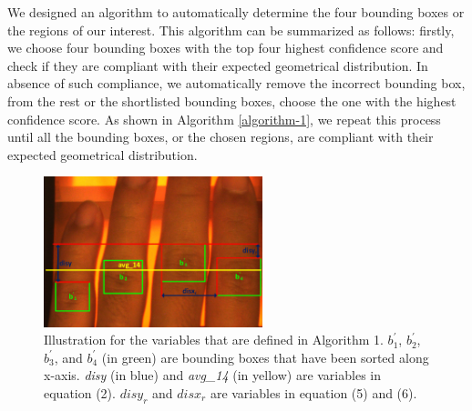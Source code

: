 We designed an algorithm to automatically determine the four bounding boxes or the regions of our interest. This algorithm can be summarized as follows: firstly, we choose four bounding boxes with the top four highest confidence score and check if they are compliant with their expected geometrical distribution. In absence of such compliance, we automatically remove the incorrect bounding box, from the rest or the shortlisted bounding boxes, choose the one with the highest confidence score. As shown in Algorithm \ref{algorithm-1}, we repeat this process until all the bounding boxes, or the chosen regions, are compliant with their expected geometrical distribution.

\begin{figure}[!ht]
    \centering
    \includegraphics[width=2.5in]{Figures/select-algorithm.png}
    \caption{Illustration for the variables that are defined in Algorithm 1. $b_1^{'}$, $b_2^{'}$, $b_3^{'}$, and $b_4^{'}$ (in green) are bounding boxes that have been sorted along x-axis. \textit{disy} (in blue) and \textit{avg\_14} (in yellow) are variables in equation (2). $disy_r$ and $disx_r$ are variables in equation (5) and (6).}
    \label{select-algorithm}
\end{figure}


